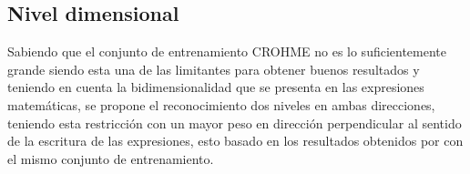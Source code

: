 \subsection{Nivel dimensional}
Sabiendo que el conjunto de entrenamiento CROHME no es lo suficientemente grande siendo esta una de las limitantes para obtener buenos resultados y teniendo en cuenta la bidimensionalidad que se presenta en las expresiones matemáticas, se propone el reconocimiento dos niveles en ambas direcciones, teniendo esta restricción con un mayor peso en dirección perpendicular al sentido de la escritura de las expresiones, esto basado en los resultados obtenidos por %
con el mismo conjunto de entrenamiento.
